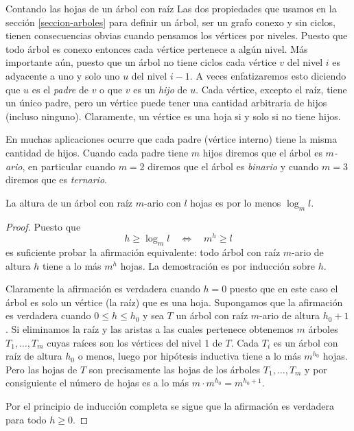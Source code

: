 \begin{section}{Contando las hojas de un árbol con raíz}
Las dos propiedades que usamos en la sección \ref{seccion-arboles} para definir un árbol, ser un grafo conexo y sin ciclos, tienen consecuencias obvias cuando pensamos los vértices por niveles. Puesto que todo árbol es conexo entonces cada vértice pertenece a algún nivel. Más importante aún, puesto que un árbol no tiene ciclos  cada
vértice $v$ del nivel $i$ es adyacente a uno y solo uno $u$ del nivel $i-1$. A veces enfatizaremos esto diciendo que $u$ es el \textit{{padre}} de $v$ o que $v$ es un \textit{{hijo}} de $u$. Cada    vértice, excepto el raíz, tiene un único padre, pero un vértice puede tener una cantidad arbitraria de hijos (incluso ninguno). Claramente, un vértice es una hoja si y solo si no tiene hijos.

En muchas aplicaciones ocurre que cada padre (vértice interno) tiene la misma cantidad de hijos. Cuando cada padre tiene $m$ hijos diremos que el árbol es \textit{$m$-ario}, en particular cuando $m=2$ diremos que el árbol es \textit{binario}     y cuando $m=3$ diremos que es \textit{ternario}.

\begin{teorema}\label{t6.1} La altura de un árbol con raíz $m$-ario con $l$ hojas es por lo menos $\log_ml$.
\end{teorema}
\begin{proof} Puesto que
$$
h \ge \log_ml \quad \Leftrightarrow \quad m^h \ge l
$$
es suficiente probar la afirmación equivalente: todo árbol con raíz $m$-ario de altura $h$ tiene a lo más $m^h$ hojas. La demostración es por inducción sobre $h$.

Claramente la afirmación es verdadera cuando $h=0$ puesto que en este caso el árbol es solo un vértice (la raíz) que es una hoja. Supongamos que la afirmación es verdadera cuando $0\le h \le h_0$ y sea $T$ un árbol con raíz $m$-ario de altura $h_0+1$. Si eliminamos la raíz y las aristas a las cuales pertenece obtenemos $m$ árboles $T_1,\ldots,T_m$ cuyas raíces son los vértices del nivel 1 de $T$. Cada $T_i$ es un árbol con raíz de altura $h_0$ o menos, luego por hipótesis inductiva tiene a lo más $m^{h_0}$ hojas. Pero las hojas de $T$ son precisamente las hojas de los árboles $T_1,\ldots,T_m$ y por consiguiente el número de hojas es a lo más $m \cdot m^{h_0}= m^{h_0+1}$.

Por el principio de inducción completa se sigue que la afirmación es verdadera para todo $h\ge 0$.
\end{proof}


\end{section}
